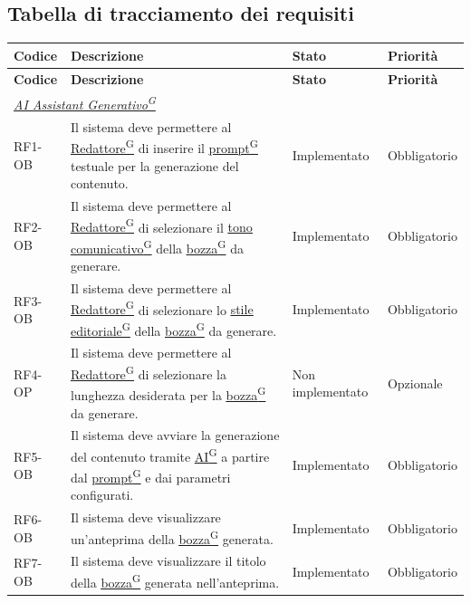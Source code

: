 \documentclass[a4paper,12pt]{article}
\providecommand{\glslink}[2]{\href{https://alittlebyte-19.github.io/Documentazione/glossario.html\#gls-#1}{\underline{#2}\textsuperscript{\scriptsize G}}}
\begin{document}
\begin{sloppypar}
\subsection{Tabella di tracciamento dei requisiti}

\renewcommand{\arraystretch}{1.3}
{\footnotesize
\setlength{\LTleft}{0pt}
\setlength{\LTright}{0pt}
\setlength{\tabcolsep}{4pt}
\begin{longtable}{|p{1.8cm}|p{8.7cm}|p{2.4cm}|p{2.1cm}|}
    \hline
    \rowcolor{gray!20}
    \textbf{Codice} & \textbf{Descrizione} & \textbf{Stato} & \textbf{Priorità} \\
    \hline
    \endfirsthead
    \hline
    \rowcolor{gray!20}
    \textbf{Codice} & \textbf{Descrizione} & \textbf{Stato} & \textbf{Priorità} \\
    \hline
    \endhead
    \multicolumn{4}{l}{\textit{\glslink{ai-assistant-generativo-ai-assistant}{AI Assistant Generativo}}} \\
    \hline
    RF1-OB & Il sistema deve permettere al \glslink{redattore}{Redattore} di inserire il \glslink{prompt}{prompt} testuale per la generazione del contenuto. & Implementato & Obbligatorio \\
    \hline
    RF2-OB & Il sistema deve permettere al \glslink{redattore}{Redattore} di selezionare il \glslink{tono-comunicativo}{tono comunicativo} della \glslink{bozza-draft}{bozza} da generare. & Implementato & Obbligatorio \\
    \hline
    RF3-OB & Il sistema deve permettere al \glslink{redattore}{Redattore} di selezionare lo \glslink{stile-editoriale}{stile editoriale} della \glslink{bozza-draft}{bozza} da generare. & Implementato & Obbligatorio \\
    \hline
    RF4-OP & Il sistema deve permettere al \glslink{redattore}{Redattore} di selezionare la lunghezza desiderata per la \glslink{bozza-draft}{bozza} da generare. & Non implementato & Opzionale \\
    \hline
    RF5-OB & Il sistema deve avviare la generazione del contenuto tramite \glslink{intelligenza-artificiale-ai}{AI} a partire dal \glslink{prompt}{prompt} e dai parametri configurati. & Implementato & Obbligatorio \\
    \hline
    RF6-OB & Il sistema deve visualizzare un'anteprima della \glslink{bozza-draft}{bozza} generata. & Implementato & Obbligatorio \\
    \hline
    RF7-OB & Il sistema deve visualizzare il titolo della \glslink{bozza-draft}{bozza} generata nell'anteprima. & Implementato & Obbligatorio \\

\end{longtable}}
\end{sloppypar}
\end{document}
